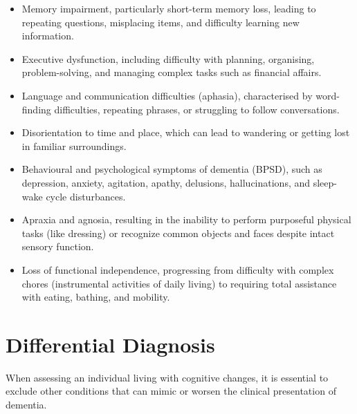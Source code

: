 \begin{itemize}
    \item Memory impairment, particularly short-term memory loss, leading to repeating questions, misplacing items, and difficulty learning new information.
    \item Executive dysfunction, including difficulty with planning, organising, problem-solving, and managing complex tasks such as financial affairs.
    \item Language and communication difficulties (aphasia), characterised by word-finding difficulties, repeating phrases, or struggling to follow conversations.
    \item Disorientation to time and place, which can lead to wandering or getting lost in familiar surroundings.
    \item Behavioural and psychological symptoms of dementia (BPSD), such as depression, anxiety, agitation, apathy, delusions, hallucinations, and sleep-wake cycle disturbances.
    \item Apraxia and agnosia, resulting in the inability to perform purposeful physical tasks (like dressing) or recognize common objects and faces despite intact sensory function.
    \item Loss of functional independence, progressing from difficulty with complex chores (instrumental activities of daily living) to requiring total assistance with eating, bathing, and mobility.
\end{itemize}

\section*{Differential Diagnosis}
When assessing an individual living with cognitive changes, it is essential to exclude other conditions that can mimic or worsen the clinical presentation of dementia.

